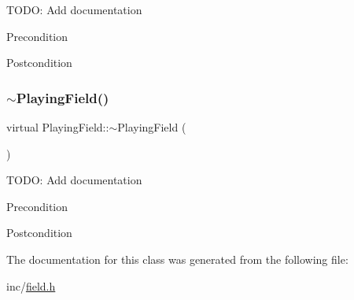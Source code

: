 T\+O\+DO\+: Add documentation \begin{DoxyPrecond}{Precondition}

\end{DoxyPrecond}
\begin{DoxyPostcond}{Postcondition}

\end{DoxyPostcond}
\mbox{\label{classPlayingField_ab88cf851b96f1e0af0b68f2e9c1146fc}} 
\subsubsection{\texorpdfstring{$\sim$PlayingField()}{~PlayingField()}}
{\footnotesize\ttfamily virtual Playing\+Field\+::$\sim$\+Playing\+Field (\begin{DoxyParamCaption}{ }\end{DoxyParamCaption})\hspace{0.3cm}{\ttfamily [virtual]}}

T\+O\+DO\+: Add documentation \begin{DoxyPrecond}{Precondition}

\end{DoxyPrecond}
\begin{DoxyPostcond}{Postcondition}

\end{DoxyPostcond}


The documentation for this class was generated from the following file\+:\begin{DoxyCompactItemize}
\item 
inc/\mbox{\hyperlink{field_8h}{field.\+h}}\end{DoxyCompactItemize}
